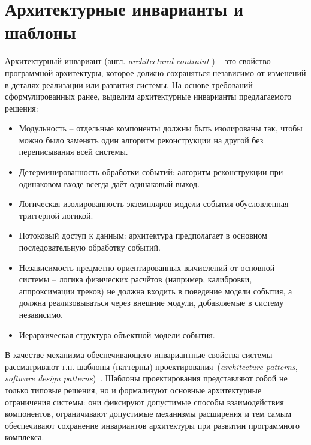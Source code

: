 \section{Архитектурные инварианты и шаблоны}

Архитектурный инвариант (англ. \emph{architectural contraint}
\cite{shaw-architecture-1996, bass-architecture}) --
это свойство программной архитектуры, которое должно
сохраняться независимо от изменений в деталях реализации или
развития системы. На основе требований сформулированных ранее,
выделим архитектурные инварианты предлагаемого решения:
\begin{itemize}
    \item Модульность -- отдельные компоненты должны
    быть изолированы так, чтобы можно было заменять
    один алгоритм реконструкции на другой без
    переписывания всей системы.
    \item Детерминированность обработки событий:
    алгоритм реконструкции при одинаковом входе
    всегда даёт одинаковый выход.
    \item Логическая изолированность экземпляров модели
    события обусловленная триггерной логикой.
    \item Потоковый доступ к данным: архитектура
    предполагает в основном последовательную обработку
    событий.
    \item Независимость предметно-ориентированных
    вычислений от основной системы -- логика физических
    расчётов (например, калибровки, аппроксимации
    треков) не должна входить в поведение модели события,
    а должна реализовываться через внешние модули,
    добавляемые в систему независимо.
    \item Иерархическая структура объектной модели
    события.
\end{itemize}

В качестве механизма обеспечивающего инвариантные свойства системы
рассматривают т.н. шаблоны (паттерны) проектирования~(\emph{architecture patterns}, \emph{software design patterns})~\cite{gof1994design-patterns}.
Шаблоны проектирования представляют собой не только типовые
решения, но и формализуют основные архитектурные ограничения
системы: они фиксируют допустимые способы взаимодействия
компонентов, ограничивают допустимые механизмы расширения и тем
самым обеспечивают сохранение инвариантов архитектуры при развитии
программного комплекса.

